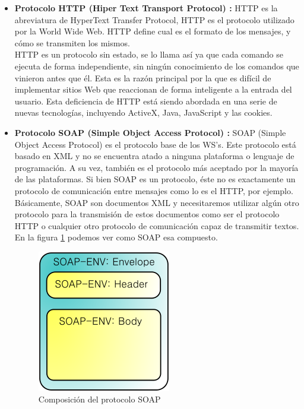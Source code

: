 \begin{itemize}
	
	\item \textbf{Protocolo HTTP (Hiper Text Transport Protocol) \cite{HTTP}:}
	 HTTP es la abreviatura de HyperText Transfer Protocol, HTTP es el protocolo utilizado por la World Wide Web. HTTP define cual es el formato de los mensajes, y cómo se transmiten los mismos.\\
	HTTP es un protocolo sin estado, se lo llama así  ya que cada comando se ejecuta de forma independiente, sin ningún conocimiento de los comandos que vinieron antes que él. Esta es la razón principal por la que es difícil de implementar sitios Web que reaccionan de forma inteligente a la entrada del usuario. Esta deficiencia de HTTP está siendo abordada en una serie de nuevas tecnologías, incluyendo ActiveX, Java, JavaScript y las cookies.
	
	\item \textbf{Protocolo SOAP (Simple Object Access Protocol) \cite{SOAP}: }
	SOAP (Simple Object Access Protocol) es el protocolo base de los WS's. Este protocolo está basado en XML y no se encuentra atado a ninguna plataforma o lenguaje de programación. A su vez, también es el protocolo más aceptado por la mayoría de las plataformas. 
	Si bien SOAP es un protocolo, éste no es exactamente un protocolo de comunicación entre mensajes como lo es el HTTP, por ejemplo. Básicamente, SOAP son documentos XML y necesitaremos utilizar algún otro protocolo para la transmisión de estos documentos como ser el protocolo HTTP o cualquier otro protocolo de comunicación capaz de transmitir textos. En la figura \ref{fig:Composición del protocolo SOAP} podemos ver como SOAP esa compuesto.
	



\begin{figure}[!h] 
	\begin{center}
		\includegraphics [scale=0.50]{imagenes/Composicion_del_protocolo_SOAP.png}
	\end{center}
	\caption{Composición del protocolo SOAP}
	\label{fig:Composición del protocolo SOAP}
\end{figure} 


\end{itemize}

